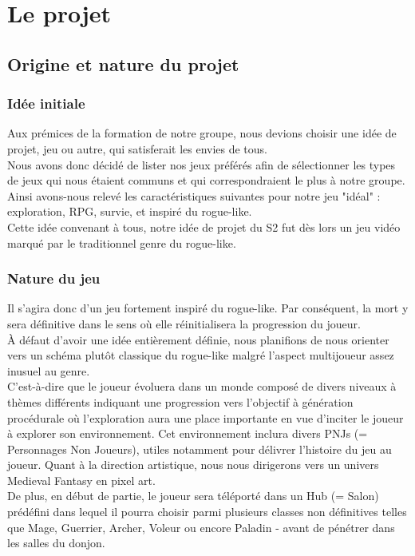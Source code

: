 \documentclass{article}
\begin{document}
\section{Le projet}

\subsection{Origine et nature du projet}


\subsubsection{Idée initiale}

Aux prémices de la formation de notre groupe, nous devions choisir une idée de projet, jeu ou autre, qui satisferait les envies de tous. \\
Nous avons donc décidé de lister nos jeux préférés afin de sélectionner les types de jeux qui nous étaient communs et qui correspondraient le plus à notre groupe. \\
Ainsi avons-nous relevé les caractéristiques suivantes pour notre jeu "idéal" : exploration, RPG, survie, et inspiré du rogue-like. \\
Cette idée convenant à tous, notre idée de projet du S2 fut dès lors un jeu vidéo marqué par le traditionnel genre du rogue-like.

\subsubsection{Nature du jeu}

Il s'agira donc d'un jeu fortement inspiré du rogue-like.
Par conséquent, la mort y sera définitive dans le sens où elle réinitialisera la progression du joueur. \\
À défaut d'avoir une idée entièrement définie, nous planifions de nous orienter vers un schéma plutôt classique du rogue-like malgré l'aspect multijoueur assez inusuel au genre. \\
C'est-à-dire que le joueur évoluera dans un monde composé de divers niveaux à thèmes différents indiquant une progression vers l'objectif à génération procédurale où l'exploration aura une place importante en vue d'inciter le joueur à explorer son environnement. Cet environnement inclura divers PNJs (= Personnages Non Joueurs), utiles notamment pour délivrer l'histoire du jeu au joueur. Quant à la direction artistique, nous nous dirigerons vers un univers Medieval Fantasy en pixel art. \\
De plus, en début de partie, le joueur sera téléporté dans un Hub (= Salon) prédéfini dans lequel il pourra choisir parmi plusieurs classes non définitives telles que Mage, Guerrier, Archer, Voleur ou encore Paladin - avant de pénétrer dans les salles du donjon.
\end{document}
